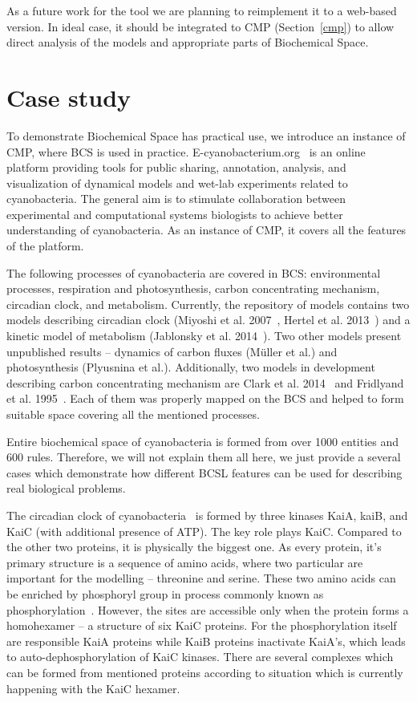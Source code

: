 \documentclass[12pt]{fithesis2}
\begin{document}
As a future work for the tool we are planning to reimplement it to a web-based version. In ideal case, it should be integrated to CMP (Section~\ref{cmp}) to allow direct analysis of the models and appropriate parts of Biochemical Space.  

\chapter{Case study}
\label{case_study}

To demonstrate Biochemical Space has practical use, we introduce an instance of CMP, where BCS is used in practice. E-cyanobacterium.org~\cite{Trojak2016} is an online platform providing tools for public sharing, annotation, analysis, and visualization of dynamical models and wet-lab experiments related to cyanobacteria. The general aim is to stimulate collaboration between experimental and computational systems biologists to achieve better understanding of cyanobacteria. As an instance of CMP, it covers all the features of the platform.

The following processes of cyanobacteria are covered in BCS: environmental processes, respiration and photosynthesis, carbon concentrating mechanism, circadian clock, and metabolism. Currently, the repository of models contains two models describing circadian clock (Miyoshi et al. 2007~\cite{Miyoshi01022007}, Hertel et al. 2013~\cite{Hertel2013}) and a kinetic model of metabolism (Jablonsky et al. 2014~\cite{Jablonsky2014}). Two other models present unpublished results -- dynamics of carbon fluxes (M\"{u}ller et al.) and photosynthesis (Plyusnina et al.). Additionally, two models in development describing carbon concentrating mechanism are Clark et al. 2014~\cite{clark2014insights} and Fridlyand et al. 1995~\cite{fridlyand1996quantitative}. Each of them was properly mapped on the BCS and helped to form suitable space covering all the mentioned processes.

Entire biochemical space of cyanobacteria is formed from over 1000 entities and 600 rules. Therefore, we will not explain them all here, we just provide a several cases which demonstrate how different BCSL features can be used for describing real biological problems.

The circadian clock of cyanobacteria~\cite{CCR} is formed by three kinases KaiA, kaiB, and KaiC (with additional presence of ATP). The key role plays KaiC. Compared to the other two proteins, it is physically the biggest one. As every protein, it's primary structure is a sequence of amino acids, where two particular are important for the modelling -- threonine and serine. These two amino acids can be enriched by phosphoryl group in process commonly known as phosphorylation~\cite{cohen2002origins}. However, the sites are accessible only when the protein forms a homohexamer -- a structure of six KaiC proteins. For the phosphorylation itself are responsible KaiA proteins while KaiB proteins inactivate KaiA's, which leads to auto-dephosphorylation of KaiC kinases. There are several complexes which can be formed from mentioned proteins according to situation which is currently happening with the KaiC hexamer.
\end{document}
